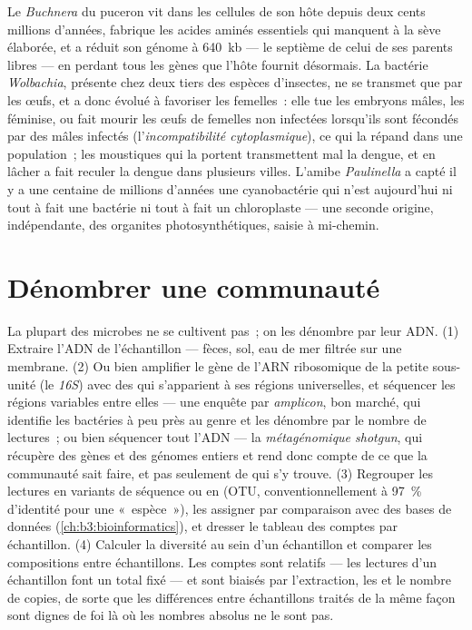 \begin{example}\label{ex:b3:microbiomes:obligate}
Le \emph{Buchnera} du puceron vit dans les cellules de son hôte depuis
deux cents millions d'années, fabrique les acides aminés essentiels qui
manquent à la sève élaborée, et a réduit son génome à \qty{640}{kb} ---
le septième de celui de ses parents libres --- en perdant tous les
gènes que l'hôte fournit désormais. La bactérie \emph{Wolbachia},
présente chez deux tiers des espèces d'insectes, ne se transmet que par
les œufs, et a donc évolué à favoriser les femelles~: elle tue les
embryons mâles, les féminise, ou fait mourir les œufs de femelles non
infectées lorsqu'ils sont fécondés par des mâles infectés
(l'\emph{incompatibilité cytoplasmique}), ce qui la répand dans une
population~; les moustiques qui la portent transmettent mal la dengue,
et en lâcher a fait reculer la dengue dans plusieurs villes. L'amibe
\emph{Paulinella} a capté il y a une centaine de millions d'années une
cyanobactérie qui n'est aujourd'hui ni tout à fait une bactérie ni tout
à fait un chloroplaste --- une seconde origine, indépendante, des
organites photosynthétiques, saisie à mi-chemin.
\end{example}

\section{Dénombrer une communauté}

\begin{method}\label{met:b3:microbiomes:16s}
La plupart des microbes ne se cultivent pas~; on les dénombre par leur
ADN. (1) Extraire l'ADN de l'échantillon --- fèces, sol, eau de mer
filtrée sur une membrane. (2) Ou bien amplifier le gène de l'ARN
ribosomique de la petite sous-unité (le \emph{16S}) avec des 
qui s'apparient à ses régions universelles, et séquencer les régions
variables entre elles --- une enquête par \emph{amplicon}, bon marché,
qui identifie les bactéries à peu près au genre et les dénombre par le
nombre de lectures~; ou bien séquencer tout l'ADN --- la
\emph{métagénomique shotgun}, qui récupère des gènes et des génomes
entiers et rend donc compte de ce que la communauté sait faire, et pas
seulement de qui s'y trouve. (3) Regrouper les lectures en variants de
séquence ou en \emph{} (OTU,
conventionnellement à \qty{97}{\%} d'identité pour une «~espèce~»), les
assigner par comparaison avec des bases de données
(\cref{ch:b3:bioinformatics}), et dresser le tableau des comptes par
échantillon. (4) Calculer la diversité au sein d'un échantillon et
comparer les compositions entre échantillons. Les comptes sont
relatifs --- les lectures d'un échantillon font un total fixé --- et
sont biaisés par l'extraction, les  et le nombre de copies, de
sorte que les différences entre échantillons traités de la même façon
sont dignes de foi là où les nombres absolus ne le sont pas.
\end{method}


